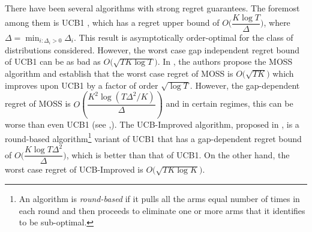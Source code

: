 	There have been several algorithms with strong regret guarantees. The foremost among them is UCB1 \cite{auer2002finite}, which has a regret upper bound of $O\bigg(\dfrac{K\log T}{\Delta}\bigg)$, where $\Delta = \min_{i:\Delta_i>0} \Delta_i$. This result is asymptotically order-optimal for the class of distributions considered. However, the worst case gap independent regret bound of UCB1  can be as bad as $O \bigg(\sqrt{TK\log T}\bigg)$.  In \cite{audibert2009minimax}, the authors propose the MOSS algorithm and establish that the worst case regret of MOSS is $O\bigg(\sqrt{TK}\bigg)$ which improves upon UCB1 by a factor of order $\sqrt{\log T}$. However, the gap-dependent regret of MOSS is  $O\left(\dfrac{K^{2}\log\left(T\Delta^{2}/K\right)}{\Delta}\right)$ and in certain regimes, this can be worse than even UCB1 (see \cite{audibert2009minimax},\cite{lattimore2015optimally}). The UCB-Improved algorithm, proposed in \cite{auer2010ucb}, is a round-based algorithm\footnote{An algorithm is \textit{round-based} if it pulls all the arms equal number of times in each round and then proceeds to eliminate one or more arms that it identifies to be sub-optimal.} variant of UCB1 that 
has a gap-dependent regret bound of $O\bigg(\dfrac{K\log T\Delta^{2}}{\Delta}\bigg)$, which is better than that of UCB1. On the other hand, the worst case regret of UCB-Improved is $O\bigg(\sqrt{TK\log K}\bigg)$. 
	
